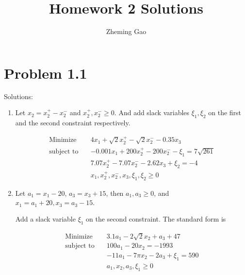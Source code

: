 \documentclass[12pt]{article}
\begin{document}
 
 
\title{Homework 2 Solutions}
\author{Zheming Gao}
\maketitle

\section*{Problem 1.1}

Solutions: 
\begin{enumerate}
\item 

Let $x_2 = x_2^+ - x_2^-$ and $x_2 ^+, x_2^- \geqslant 0$.
And add slack variables $\xi_1, \xi_2$ on the first and the second constraint respectively.

\begin{equation*}
\begin{aligned}
\text{Minimize} \quad & 4x_1 + \sqrt{2}x_2^+ - \sqrt{2}x_2^- - 0.35 x_3 \\
\text{subject\  to} \quad & -0.001x_1 + 200 x_2^+ - 200 x_2^- - \xi_1 = 7\sqrt{261} \\
& 7.07 x_2^+ - 7.07 x_2^- - 2.62 x_3 + \xi_2 = -4 \\
& x_1, x_2^+, x_2^-, x_3, \xi_1, \xi_2 \geqslant 0
\end{aligned}
\end{equation*}

\item

Let $a_1 = x_1 - 20$, $a_3 = x_3 + 15$, then $a_1, a_3 \geqslant 0$, and $x_1 = a_1 + 20, x_3 = a_3 - 15$.

Add a slack variable $\xi_1$ on the second constraint. The standard form is

\begin{equation*}
\begin{aligned}
\text{Minimize} \quad & 3.1a_1 - 2\sqrt{2}x_2 + a_3 + 47 \\
\text{subject\  to} \quad & 100a_1 - 20 x_2 = -1993 \\
& -11a_1 - 7\pi x_2 - 2a_3 + \xi_1 = 590\\
& a_1, x_2, a_3, \xi_1 \geqslant 0
\end{aligned}
\end{equation*}


\end{enumerate}
\end{document}
